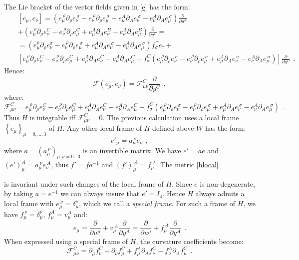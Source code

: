 \documentclass[10pt, cmp, numbook, final, a4paper]{svjour}
\newcommand*{\SavedEqref}{}
\let\SavedEqref\eqref
\renewcommand*{\eqref}[1]{%
  \begingroup
    \hypersetup{
      linkcolor=blue,
      linkbordercolor=blue,
    }%
    \SavedEqref{#1}%
  \endgroup
}
\newcommand{\be}{\begin{equation*}}
\newcommand{\ee}{\end{equation*}}
\newcommand{\ben}{\begin{equation}}
\newcommand{\een}{\end{equation}}
\newcommand{\beqa}{\begin{eqnarray*}}
\newcommand{\eeqa}{\end{eqnarray*}}
\newcommand{\nn}{\nonumber}
\def\cF{\mathcal{F}}
\begin{document}
The Lie bracket of the vector fields given in \eqref{e} has the form:
\beqa
&& [e_\mu,e_\nu]=(e_\mu^{~\rho}\partial_\rho
e_\nu^{~\sigma}-e_\nu^{~\rho}\partial_\rho e_\mu^{~\sigma}+ e_\mu^A \partial_A
e_\nu^{~\sigma}-e_\nu^A\partial_A e_\mu^{~\sigma})\frac{\partial}{\partial
	u^\sigma}\nn \\ && + (e_\mu^{~\rho} \partial_\rho e_\nu^C -e_\nu^{~\rho} \partial_\rho e_\mu^C + e_\mu^A\partial_A e_\nu^B- e_\nu^A\partial_A e_\mu^B)\frac{\partial}{\partial y^C}=\nn\\
&& =(e_\mu^\rho\partial_\rho
e_\nu^\sigma-e_\nu^{~\rho}\partial_\rho e_\mu^{~\sigma}+ e_\mu^A \partial_A
e_\nu^{~\sigma}-e_\nu^A\partial_A e_\mu^{~\sigma})f_\sigma^{~\tau} e_\tau+ \nn\\
&& [e_\mu^{~\rho} \partial_\rho e_\nu^C -e_\nu^{~\rho}
\partial_\rho e_\mu^C + e_\mu^A\partial_A e_\nu^C- e_\nu^A\partial_A e_\mu^C
-f_\sigma^C(e_\mu^{~\rho}\partial_\rho
e_\nu^{~\sigma}-e_\nu^{~\rho}\partial_\rho e_\mu^{~\sigma}+ e_\mu^A \partial_A
e_\nu^{~\sigma}-e_\nu^A\partial_A e_\mu^{~\sigma}) ]\frac{\partial}{\partial y^C}~~.
\eeqa
Hence:
\be
\cF(e_\mu,e_\nu)=\cF_{\mu\nu}^C\frac{\partial}{\partial y^C}~~,
\ee
where: 
\be
\cF_{\mu\nu}^C=e_\mu^{~\rho} \partial_\rho e_\nu^C -e_\nu^{~\rho} \partial_\rho
e_\mu^C + e_\mu^A\partial_A e_\nu^C- e_\nu^A\partial_A
e_\mu^C-f_\sigma^C(e_\mu^{~\rho}\partial_\rho
e_\nu^{~\sigma}-e_\nu^{~\rho}\partial_\rho e_\mu^{~\sigma}+ e_\mu^A
\partial_A e_\nu^{~\sigma}-e_\nu^A\partial_A e_\mu^{~\sigma})~~.
\ee
Thus $H$ is integrable iff $\cF_{\mu\nu}^C=0$. The previous
calculation uses a local frame $\left\{ e_{\mu}\right\}_{\mu =
  0,\hdots,3}$ of $H$. Any other local frame of $H$ defined above $W$
has the form:
\be
e'_\mu=a_\mu^{~\nu}e_\nu~~,
\ee
where $a=(a_\mu^{~\nu})_{\mu,\nu=0\ldots 3}$ is an invertible
matrix. We have $e'=ae$ and $(e')_\mu^A=a_\mu^{~\nu}e_\nu^{~A}$, thus
$f'=fa^{-1}$ and $(f')_\mu^{~A}=f_\mu^{~A}$. The metric \eqref{hlocal}
is invariant under such changes of the local frame of $H$. Since $e$
is non-degenerate, by taking $a=e^{-1}$ we can always insure that
$e'=I_4$.  Hence $H$ always admits a local frame with
$e_\mu^{~\nu}=\delta_\mu^\nu$, which we call a {\em special
  frame}. For such a frame of $H$, we have
$f_\mu^{~\nu}=\delta_\mu^\nu$, $f_\mu^A=v_\mu^A$ and:
\be
e_\mu=\frac{\partial}{\partial u^\mu}+v_\mu^{~A} \frac{\partial}{\partial y^A}=
\frac{\partial}{\partial u^\mu}+f_\mu^{~A} \frac{\partial}{\partial y^A}~~.
\ee
When expressed using a special frame of $H$, the curvature coefficients become: 
\ben
\cF_{\mu\nu}^C=\partial_\mu f_\nu^C-\partial_\nu f_\mu^C+f_\mu^A\partial_A f_\nu^C-f_\nu^A\partial_A f_\mu^C~~.
\een
\end{document}
